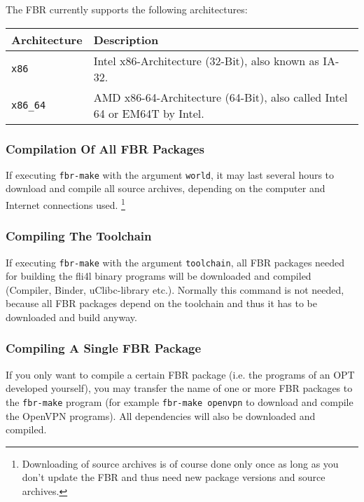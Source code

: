 The FBR currently supports the following architectures:

\begin{longtable}{|l|p{10cm}|}
    \hline
    \multicolumn{1}{|l}{\textbf{Architecture}} &
    \multicolumn{1}{|l|}{\textbf{Description}} \\
    \hline
    \endhead
    \hline
    \endfoot
    \endlastfoot
\texttt{x86} &
    Intel x86-Architecture (32-Bit), also known as IA-32. \\
\hline
\texttt{x86\_64} &
    AMD x86-64-Architecture (64-Bit), also called Intel 64 or EM64T by Intel. \\
\hline
\end{longtable}

\subsubsection{Compilation Of All FBR Packages}

If executing \texttt{fbr-make} with the argument \texttt{world},
it may last several hours to download and compile all source archives,
depending on the computer and Internet connections used.
\footnote{Downloading of source archives is of course done only once
as long as you don't update the FBR and thus need new package versions
and source archives.}

\subsubsection{Compiling The Toolchain}

If executing \texttt{fbr-make} with the argument \texttt{toolchain},
all FBR packages needed for building the fli4l binary programs will
be downloaded and compiled (Compiler, Binder, uClibc-library etc.).
Normally this command is not needed, because all FBR packages depend
on the toolchain and thus it has to be downloaded and build anyway.

\subsubsection{Compiling A Single FBR Package}

If you only want to compile a certain FBR package (i.e. the programs
of an OPT developed yourself), you may transfer the name of one or more
FBR packages to the \texttt{fbr-make} program (for example \texttt{fbr-make
openvpn} to download and compile the OpenVPN programs). All dependencies will
also be downloaded and compiled.


